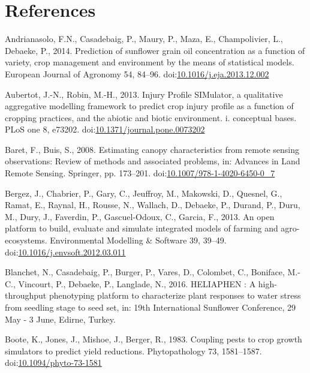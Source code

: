 \documentclass[a4paper]{article}
\begin{document}
\newpage

\section*{References}\label{references}

\hypertarget{refs}{}
\hypertarget{ref-Andrianasolo2014}{}
Andrianasolo, F.N., Casadebaig, P., Maury, P., Maza, E., Champolivier,
L., Debaeke, P., 2014. Prediction of sunflower grain oil concentration
as a function of variety, crop management and environment by the means
of statistical models. European Journal of Agronomy 54, 84--96.
doi:\href{https://doi.org/10.1016/j.eja.2013.12.002}{10.1016/j.eja.2013.12.002}

\hypertarget{ref-Aubertot2013}{}
Aubertot, J.-N., Robin, M.-H., 2013. Injury Profile SIMulator, a
qualitative aggregative modelling framework to predict crop injury
profile as a function of cropping practices, and the abiotic and biotic
environment. i. conceptual bases. PLoS one 8, e73202.
doi:\href{https://doi.org/10.1371/journal.pone.0073202}{10.1371/journal.pone.0073202}

\hypertarget{ref-Baret2008}{}
Baret, F., Buis, S., 2008. Estimating canopy characteristics from remote
sensing observations: Review of methods and associated problems, in:
Advances in Land Remote Sensing. Springer, pp. 173--201.
doi:\href{https://doi.org/10.1007/978-1-4020-6450-0_7}{10.1007/978-1-4020-6450-0\_7}

\hypertarget{ref-Bergez2013}{}
Bergez, J., Chabrier, P., Gary, C., Jeuffroy, M., Makowski, D., Quesnel,
G., Ramat, E., Raynal, H., Rousse, N., Wallach, D., Debaeke, P., Durand,
P., Duru, M., Dury, J., Faverdin, P., Gascuel-Odoux, C., Garcia, F.,
2013. An open platform to build, evaluate and simulate integrated models
of farming and agro-ecosystems. Environmental Modelling \& Software 39,
39--49.
doi:\href{https://doi.org/10.1016/j.envsoft.2012.03.011}{10.1016/j.envsoft.2012.03.011}

\hypertarget{ref-Blanchet2016}{}
Blanchet, N., Casadebaig, P., Burger, P., Vares, D., Colombet, C.,
Boniface, M.-C., Vincourt, P., Debaeke, P., Langlade, N., 2016.
HELIAPHEN : A high-throughput phenotyping platform to characterize plant
responses to water stress from seedling stage to seed set, in: 19th
International Sunflower Conference, 29 May - 3 June, Edirne, Turkey.

\hypertarget{ref-Boote1983}{}
Boote, K., Jones, J., Mishoe, J., Berger, R., 1983. Coupling pests to
crop growth simulators to predict yield reductions. Phytopathology 73,
1581--1587.
doi:\href{https://doi.org/10.1094/phyto-73-1581}{10.1094/phyto-73-1581}
\end{document}
